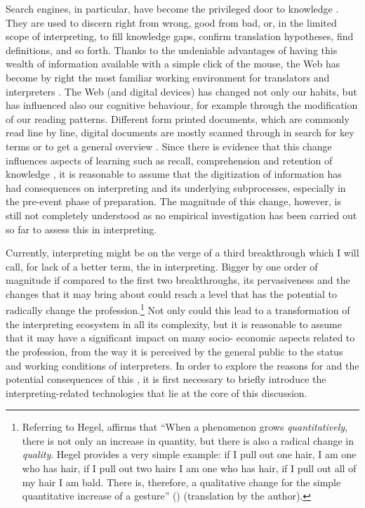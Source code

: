 \documentclass[output=paper]{langsci/langscibook}
\begin{document}
Search engines, in particular, have become the privileged door to knowledge \citep{finn_what_2017}. They are used to discern right from wrong, good from bad, or, in the limited scope of interpreting, to fill knowledge gaps, confirm translation hypotheses, find definitions, and so forth. Thanks to the undeniable advantages of having this wealth of information available with a simple click of the mouse, the Web has become by right the most familiar working environment for translators and interpreters \citep{zanettin_corpora_2002}. The Web (and digital devices) has changed not only our habits, but has influenced also our cognitive behaviour, for example through the modification of our reading patterns. Different form printed documents, which are commonly read line by line, digital documents are mostly scanned through in search for key terms or to get a general overview \citep{pernice_f-shaped_2017}. Since there is evidence that this change influences aspects of learning such as recall, comprehension and retention of knowledge \citep{ross_print_2017}, it is reasonable to assume that the digitization of information has had consequences on interpreting and its underlying subprocesses, especially in the pre-event phase of preparation. The magnitude of this change, however, is still not completely understood as no empirical  investigation has been  carried out so far to assess this in interpreting.%
 
Currently, interpreting might be on the verge of a third breakthrough which I will call, for lack of a better term, the  in interpreting. Bigger by one order of magnitude if compared to the first two breakthroughs, its pervasiveness and the changes that it may bring about could reach a level that has the potential to radically change the profession.\footnote{Referring to Hegel, \citeauthor{galimberti_i_2009} affirms that ``When a phenomenon grows \textit{quantitatively}, there is not only an increase in quantity, but there is also a radical change in \textit{quality}. Hegel provides a very simple example: if I pull out one hair, I am one who has hair, if I pull out two hairs I am one who has hair, if I pull out all of my hair I am bald. There is, therefore, a qualitative change for the simple quantitative increase of a gesture'' (\citeyear[215]{galimberti_i_2009}) (translation by the author).} Not only could this lead to a transformation of the interpreting ecosystem in all its complexity, but it is reasonable to assume that it may have a significant impact on many socio- economic aspects related to the profession, from the way it is perceived by the general public to the status and working conditions of interpreters. In order to explore the reasons for and the potential consequences of this , it is first necessary to briefly introduce the interpreting-related technologies that lie at the core of this discussion. 
 
\end{document}
